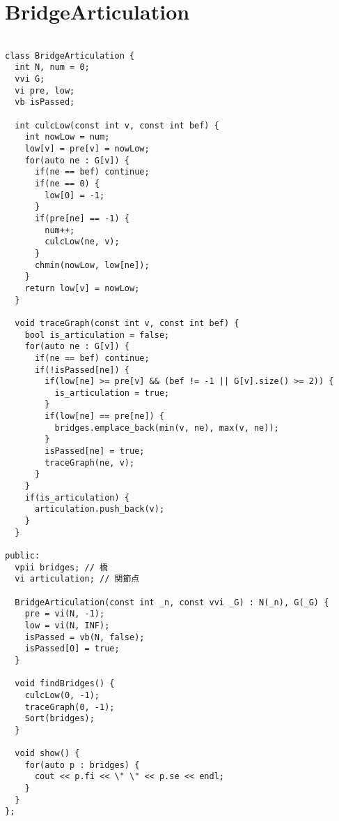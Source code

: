 \documentclass[a4j,titlepage]{jarticle} %
\begin{document}
\section{BridgeArticulation}
\color{black}
\begin{lstlisting}[caption=BridgeArticulation]

class BridgeArticulation {
  int N, num = 0;
  vvi G;
  vi pre, low;
  vb isPassed;

  int culcLow(const int v, const int bef) {
    int nowLow = num;
    low[v] = pre[v] = nowLow;
    for(auto ne : G[v]) {
      if(ne == bef) continue;
      if(ne == 0) {
        low[0] = -1;
      }
      if(pre[ne] == -1) {
        num++;
        culcLow(ne, v);
      }
      chmin(nowLow, low[ne]);
    }
    return low[v] = nowLow;
  }

  void traceGraph(const int v, const int bef) {
    bool is_articulation = false;
    for(auto ne : G[v]) {
      if(ne == bef) continue;
      if(!isPassed[ne]) {
        if(low[ne] >= pre[v] && (bef != -1 || G[v].size() >= 2)) {
          is_articulation = true;
        }
        if(low[ne] == pre[ne]) {
          bridges.emplace_back(min(v, ne), max(v, ne));
        }
        isPassed[ne] = true;
        traceGraph(ne, v);
      }
    }
    if(is_articulation) {
      articulation.push_back(v);
    }
  }

public:
  vpii bridges; // 橋
  vi articulation; // 関節点

  BridgeArticulation(const int _n, const vvi _G) : N(_n), G(_G) {
    pre = vi(N, -1);
    low = vi(N, INF);
    isPassed = vb(N, false);
    isPassed[0] = true;
  }

  void findBridges() {
    culcLow(0, -1);
    traceGraph(0, -1);
    Sort(bridges);
  }

  void show() {
    for(auto p : bridges) {
      cout << p.fi << \" \" << p.se << endl; 
    }
  }
};

\end{lstlisting}

\color{white}
\end{document}
